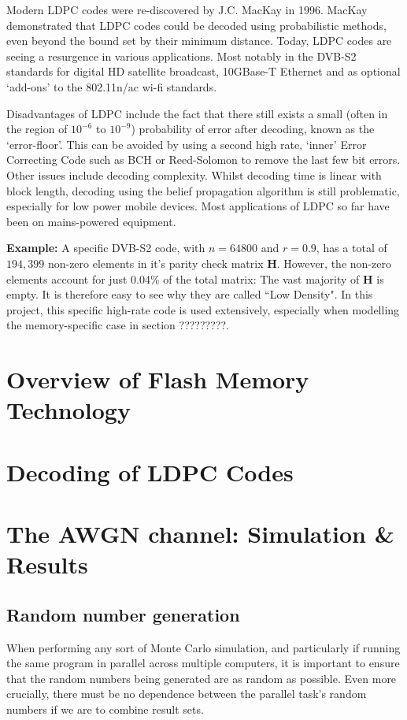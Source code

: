 \documentclass[11pt]{article}
\numberwithin{equation}{subsection}
\begin{document}
Modern LDPC codes were re-discovered by J.C. MacKay in 1996. MacKay demonstrated that LDPC codes could be decoded using probabilistic methods, even beyond the bound set by their minimum distance. Today, LDPC codes are seeing a resurgence in various applications. Most notably in the DVB-S2 standards for digital HD satellite broadcast, 10GBase-T Ethernet and as optional `add-ons' to the 802.11n/ac wi-fi standards.

Disadvantages of LDPC include the fact that there still exists a small (often in the region of $10^{-6}$ to $10^{-9}$) probability of error after decoding, known as the `error-floor'. This can be avoided by using a second high rate, `inner' Error Correcting Code such as BCH or Reed-Solomon to remove the last few bit errors. Other issues include decoding complexity. Whilst decoding time is linear with block length, decoding using the belief propagation algorithm is still problematic, especially for low power mobile devices. Most applications of LDPC so far have been on mains-powered equipment.


\textbf{Example:}
A specific DVB-S2 code, with $n = 64800$ and $r = 0.9$, has a total of $194,399$ non-zero elements in it's parity check matrix $\mathbf{H}$. However, the non-zero elements account for just 0.04\% of the total matrix: The vast majority of $\mathbf{H}$ is empty. It is therefore easy to see why they are called ``Low Density". In this project, this specific high-rate code is used extensively, especially when modelling the memory-specific case in section ?????????.

\section{Overview of Flash Memory Technology} 

\section{Decoding of LDPC Codes}

\section{The AWGN channel: Simulation \& Results}
\subsection{Random number generation}
When performing any sort of Monte Carlo simulation, and particularly if running the same program in parallel across multiple computers, it is important to ensure that the random numbers being generated are as random as possible. Even more crucially, there must be no dependence between the parallel task's random numbers if we are to combine result sets.
\end{document}
